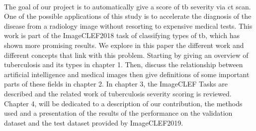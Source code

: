 \paragraph{}
The goal of our project is to automatically give a score of \ac{tb} severity via \ac{ct} scan. One of the possible applications of this study is to accelerate the diagnosis of the disease from a radiology image without resorting to expensive medical tests. This work is part of the ImageCLEF2018  task of classifying types of \ac{tb}, which has shown more promising results. We explore in this paper the different work and different concepts that link with this problem. Starting by giving an overview of tuberculosis and its types in chapter 1. Then, discuss the relationship between artificial intelligence and medical images then give definitions of some important parts of these fields in chapter 2. In chapter 3, the ImageCLEF Tasks are described and the related work of tuberculosis severity scoring is reviewed. Chapter 4, will be dedicated to a description of our contribution, the methods used and a presentation of the results of the performance on the validation dataset and the test dataset provided by ImageCLEF2019\cite{ImageCLEF:1}.